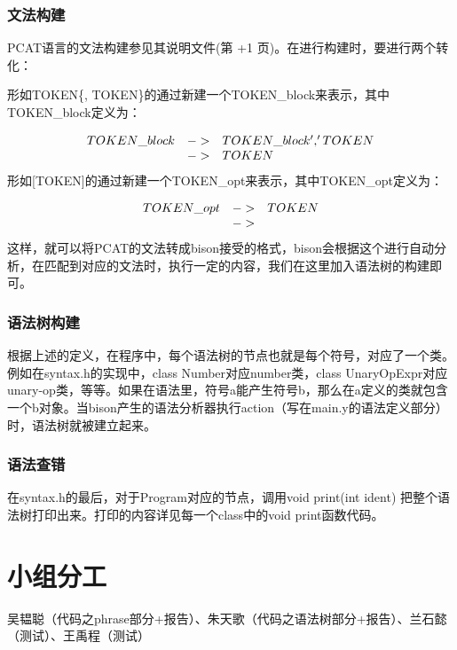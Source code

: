 \documentclass{article}
\begin{document}
\subsubsection{文法构建} %
\label{ssub:文法构建}
PCAT语言的文法构建参见其说明文件(第 \number\numexpr\value{page}+1 页)。在进行构建时，要进行两个转化：\par
形如TOKEN\{, TOKEN\}的通过新建一个TOKEN\_block来表示，其中TOKEN\_block定义为：\par
\[
\begin{array}[h]{lll}
  TOKEN\_block & -> & TOKEN\_block ',' TOKEN\\
  & -> & TOKEN
\end{array}
\]
形如[TOKEN]的通过新建一个TOKEN\_opt来表示，其中TOKEN\_opt定义为：\par
\[
\begin{array}[h]{lll}
  TOKEN\_opt & -> & TOKEN\\
  & -> & 
\end{array}
\]
这样，就可以将PCAT的文法转成bison接受的格式，bison会根据这个进行自动分析，在匹配到对应的文法时，执行一定的内容，我们在这里加入语法树的构建即可。

\subsubsection{语法树构建} %
\label{ssub:语法树构建}
根据上述的定义，在程序中，每个语法树的节点也就是每个符号，对应了一个类。例如在syntax.h的实现中，class Number对应number类，class UnaryOpExpr对应unary-op类，等等。如果在语法里，符号a能产生符号b，那么在a定义的类就包含一个b对象。当bison产生的语法分析器执行action（写在main.y的语法定义部分）时，语法树就被建立起来。\par


\subsubsection{语法查错} %
\label{ssub:语法查错}
在syntax.h的最后，对于Program对应的节点，调用void print(int ident) 把整个语法树打印出来。打印的内容详见每一个class中的void print函数代码。\par




\section{小组分工} %
\label{sec:小组分工}
吴韫聪（代码之phrase部分+报告）、朱天歌（代码之语法树部分+报告）、兰石懿（测试）、王禹程（测试）
\end{document}

